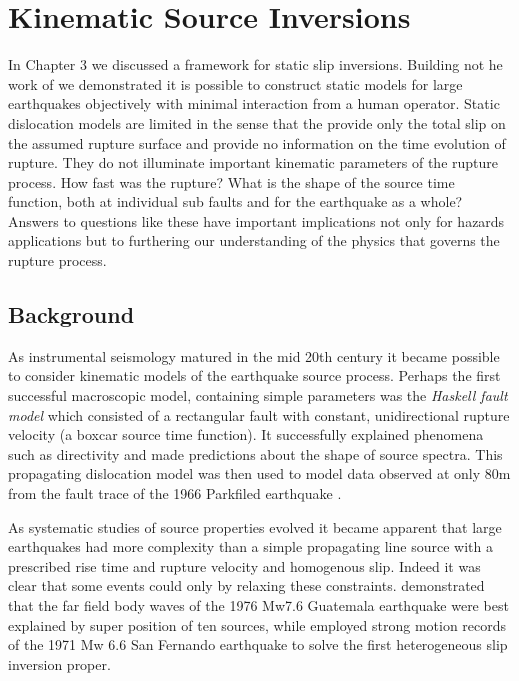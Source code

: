 
\chapter{Kinematic Source Inversions}

In Chapter 3 we discussed a framework for static slip inversions. Building not he work of \citet{Crowell2012} we demonstrated it is possible to construct static models for large earthquakes objectively with minimal interaction from a human operator. Static dislocation models are limited in the sense that the provide only the total slip on the assumed rupture surface and provide no information on the time evolution of rupture. They do not illuminate important kinematic parameters of the rupture process. How fast was the rupture? What is the shape of the source time function, both at individual sub faults and for the earthquake as a whole? Answers to questions like these have important implications not only for hazards applications but to furthering our understanding of the physics that governs the rupture process.

\section{Background}

As instrumental seismology matured in the mid 20th century it became possible to consider kinematic models of the earthquake source process. Perhaps the first successful macroscopic model, containing simple parameters was the \textit{Haskell fault model} \citep{haskell1964,haskell1969} which consisted of a rectangular fault with constant, unidirectional rupture velocity (a boxcar source time function). It successfully explained phenomena such as directivity and made predictions about the shape of source spectra. This propagating dislocation model was then used to model data observed at only 80m from the fault trace of the 1966 Parkfiled earthquake \citep{aki1968}.

As systematic studies of source properties evolved it became apparent that large earthquakes had more complexity than a simple propagating line source with a prescribed rise time and rupture velocity and homogenous slip. Indeed it was clear that some events could only by relaxing these constraints. \citet{kanamori1978} demonstrated that the far field body waves of the 1976 Mw7.6 Guatemala earthquake were best explained by super position of ten sources, while \citet{trifunac1974} employed strong motion records of the 1971 Mw 6.6 San Fernando earthquake to solve the first heterogeneous slip inversion proper.

